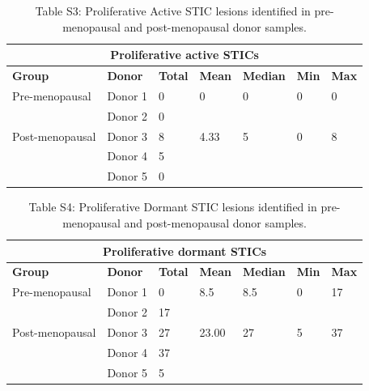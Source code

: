 \begin{refsection}
    \begin{table}[htbp]
        \centering
        \renewcommand{\arraystretch}{1.2}
        \caption{Table S3: Proliferative Active STIC lesions identified in pre-menopausal and post-menopausal donor samples.}
        \begin{tabularx}{\textwidth}{l l X X X X X}
            \toprule
            \multicolumn{7}{c}{\textbf{Proliferative active STICs}} \\
            \midrule
            \textbf{Group} & \textbf{Donor} & \textbf{Total} & \textbf{Mean} & \textbf{Median} & \textbf{Min} & \textbf{Max} \\
            \midrule
            Pre-menopausal & Donor 1 & 0 & 0 & 0 & 0 & 0 \\
            & Donor 2 & 0 &  &  &  &  \\
            Post-menopausal & Donor 3 & 8 & 4.33 & 5 & 0 & 8 \\
            & Donor 4 & 5 &  &  &  &  \\
            & Donor 5 & 0 &  &  &  &  \\
            \bottomrule
        \end{tabularx}
    \end{table}
    
    \begin{table}[htbp]
        \centering
        \renewcommand{\arraystretch}{1.2}
        \caption{Table S4: Proliferative Dormant STIC lesions identified in pre-menopausal and post-menopausal donor samples.}
        \begin{tabularx}{\textwidth}{l l X X X X X}
            \toprule
            \multicolumn{7}{c}{\textbf{Proliferative dormant STICs}} \\
            \midrule
            \textbf{Group} & \textbf{Donor} & \textbf{Total} & \textbf{Mean} & \textbf{Median} & \textbf{Min} & \textbf{Max} \\
            \midrule
            Pre-menopausal & Donor 1 & 0 & 8.5 & 8.5 & 0 & 17 \\
            & Donor 2 & 17 &  &  &  &  \\
            Post-menopausal & Donor 3 & 27 & 23.00 & 27 & 5 & 37 \\
            & Donor 4 & 37 &  &  &  &  \\
            & Donor 5 & 5 &  &  &  &  \\
            \bottomrule
        \end{tabularx}
    \end{table}
    

\end{refsection}

